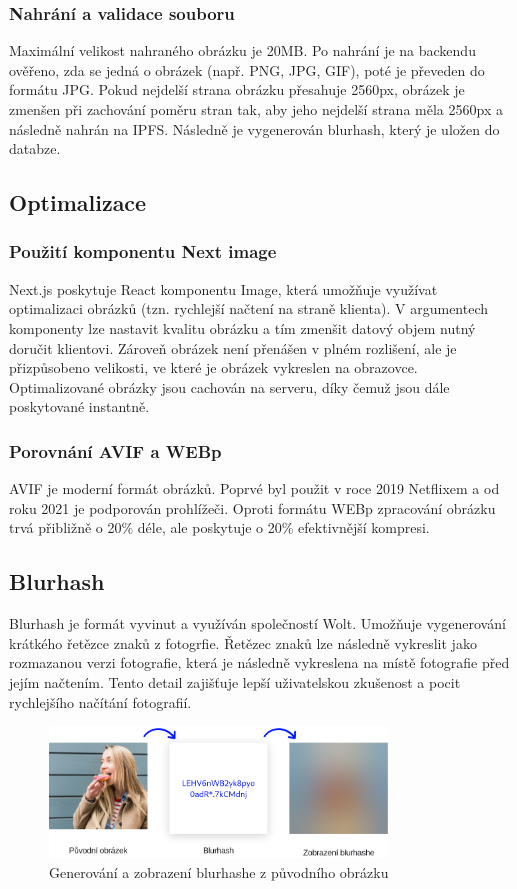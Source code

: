 \documentclass[12pt, a4paper,
 twoside,        %
 openright
]{report}
\begin{document}
\subsubsection{Nahrání a validace souboru} Maximální velikost nahraného obrázku je 20MB.  Po nahrání je na backendu ověřeno, zda se jedná o obrázek (např. PNG, JPG, GIF), poté je převeden do formátu JPG. Pokud nejdelší strana obrázku přesahuje 2560px, obrázek je zmenšen při zachování poměru stran tak, aby jeho nejdelší strana měla 2560px a následně nahrán na IPFS. Následně je vygenerován blurhash, který je uložen do databze.
\subsection{Optimalizace}
\subsubsection{Použití komponentu Next image}
Next.js poskytuje React komponentu Image, která umožňuje využívat optimalizaci obrázků (tzn. rychlejší načtení na straně klienta). V argumentech komponenty lze nastavit kvalitu obrázku a tím zmenšit datový objem nutný doručit klientovi. Zároveň obrázek není přenášen v plném rozlišení, ale je přizpůsobeno velikosti, ve které je obrázek vykreslen na obrazovce. Optimalizované obrázky jsou cachován na serveru, díky čemuž jsou dále poskytované instantně.
\subsubsection{Porovnání AVIF a WEBp}
AVIF je moderní formát obrázků. Poprvé byl použit v roce 2019 Netflixem a od roku 2021 je podporován prohlížeči. Oproti formátu WEBp zpracování obrázku trvá přibližně o 20\% déle, ale poskytuje o 20\% efektivnější kompresi.
\subsection{Blurhash}
Blurhash je formát vyvinut a využíván společností Wolt. Umožňuje vygenerování krátkého řetězce znaků z fotogrfie. Řetězec znaků lze následně vykreslit jako rozmazanou verzi fotografie, která je následně vykreslena na místě fotografie před jejím načtením. Tento detail zajišťuje lepší uživatelskou zkušenost a pocit rychlejšího načítání fotografií.

\begin{figure}[h]
	\centering
	\includegraphics[width=0.8\textwidth]{images/blurhash.png}
	\caption{Generování a zobrazení blurhashe z původního obrázku}
\end{figure}
	
\end{document}
